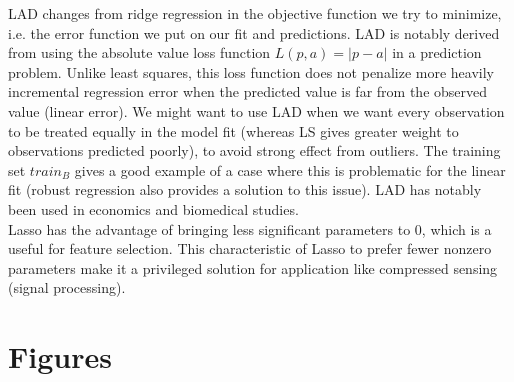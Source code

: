 \documentclass[twoside]{article}
\begin{document}
LAD changes from ridge regression in the objective function we try to minimize, i.e. the error function we put on our fit and predictions. LAD is notably derived from using the absolute value loss function $L(p, a) = \left| p - a \right|$ in a prediction problem. Unlike least squares, this loss function does not penalize more heavily incremental regression error when the predicted value is far from the observed value (linear error). We might want to use LAD when we want every observation to be treated equally in the model fit (whereas LS gives greater weight to observations predicted poorly), to avoid strong effect from outliers. The training set $train_B$ gives a good example of a case where this is problematic for the linear fit (robust regression also provides a solution to this issue). LAD has notably been used in economics and biomedical studies.\\

Lasso has the advantage of bringing less significant parameters to 0, which is a useful for feature selection. This characteristic of Lasso to prefer fewer nonzero parameters make it a privileged solution for application like compressed sensing (signal processing).

\appendix
\section{Figures}




\end{document}
